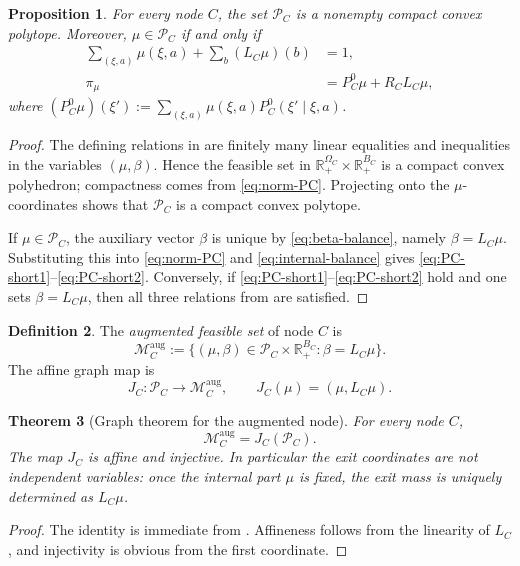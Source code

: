 \documentclass[12pt]{article}
\newtheorem{theorem}{Theorem}[section]
\newtheorem{proposition}[theorem]{Proposition}
\theoremstyle{definition}
\newtheorem{definition}[theorem]{Definition}
\newcommand{\R}{\mathbb{R}}
\newcommand{\1}{\mathbf{1}}
\newcommand{\cM}{\mathcal{M}}
\newcommand{\cP}{\mathcal{P}}
\begin{document}
\begin{proposition}
\label{prop:PC-polytope}
For every node $C$, the set $\cP_C$ is a nonempty compact convex polytope.
Moreover, $\mu\in\cP_C$ if and only if
\begin{align}
\sum_{(\xi,a)}\mu(\xi,a)+\sum_b (L_C\mu)(b)&=1,
\label{eq:PC-short1}
\\
\pi_\mu &= P_C^0\mu + R_C L_C\mu,
\label{eq:PC-short2}
\end{align}
where $(P_C^0\mu)(\xi'):=\sum_{(\xi,a)}\mu(\xi,a)P_C^0(\xi'\mid\xi,a)$.
\end{proposition}

\begin{proof}
The defining relations in  are finitely many linear equalities and
inequalities in the variables $(\mu,\beta)$.  Hence the feasible set in
$\R_+^{\Omega_C}\times\R_+^{B_C}$ is a compact convex polyhedron; compactness
comes from \eqref{eq:norm-PC}.  Projecting onto the $\mu$-coordinates shows that
$\cP_C$ is a compact convex polytope.

If $\mu\in\cP_C$, the auxiliary vector $\beta$ is unique by
\eqref{eq:beta-balance}, namely $\beta=L_C\mu$.  Substituting this into
\eqref{eq:norm-PC} and \eqref{eq:internal-balance} gives
\eqref{eq:PC-short1}--\eqref{eq:PC-short2}.  Conversely, if
\eqref{eq:PC-short1}--\eqref{eq:PC-short2} hold and one sets $\beta=L_C\mu$, then
all three relations from  are satisfied.
\end{proof}

\begin{definition}
\label{def:MCaug}
The \emph{augmented feasible set} of node $C$ is
\[
\cM_C^{\mathrm{aug}}
:=
\{(\mu,\beta)\in\cP_C\times\R_+^{B_C}:\beta=L_C\mu\}.
\]
The affine graph map is
\[
J_C:\cP_C\to \cM_C^{\mathrm{aug}},
\qquad J_C(\mu)=(\mu,L_C\mu).
\]
\end{definition}

\begin{theorem}[Graph theorem for the augmented node]
\label{thm:graph-theorem}
For every node $C$,
\[
\cM_C^{\mathrm{aug}} = J_C(\cP_C).
\]
The map $J_C$ is affine and injective.  In particular the exit coordinates are not
independent variables: once the internal part $\mu$ is fixed, the exit mass is
uniquely determined as $L_C\mu$.
\end{theorem}

\begin{proof}
The identity is immediate from .  Affineness follows from the
linearity of $L_C$, and injectivity is obvious from the first coordinate.
\end{proof}
\end{document}
